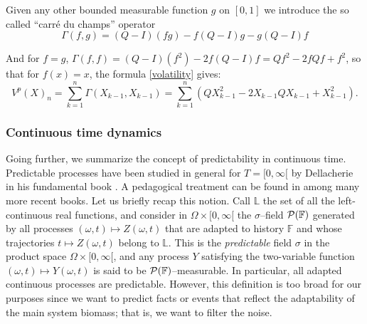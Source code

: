 \documentclass[12pt]{article}
\begin{document}
Given any other bounded measurable function $g$ on $[0,1]$ we introduce the so called ``carré du champs'' operator
\begin{equation}
    \Gamma (f,g)=(Q-I)(fg)-f(Q-I)g-g(Q-I)f
\end{equation}

And for $f=g$, $\Gamma (f,f)=(Q-I)(f^2)-2f(Q-I)f=Qf^2-2fQf+f^2$, so that for $f(x)=x$, the formula \eqref{volatility} gives:
\begin{equation}
    V^p(X)_n=\sum_{k=1}^n\Gamma (X_{k-1},X_{k-1})=\sum_{k=1}^n\left(QX_{k-1}^2-2X_{k-1}QX_{k-1}+X_{k-1}^2\right).
\end{equation}
\subsubsection{Continuous time dynamics}
Going further, we summarize the concept of predictability in continuous time. Predictable processes have been studied in general for $T=[0,\infty[$ by Dellacherie in his fundamental book \citep{Dellacherie-1972}. A pedagogical treatment can be found in \citep{Protter} among many more recent books. Let us briefly recap this notion. Call $\mathbb{L}$ the set of all the left-continuous real functions, and consider in $\Omega\times [0,\infty[$ the $\sigma$--field $\mathcal{P}(\mathbb{F})$ generated by all processes $(\omega,t)\mapsto Z(\omega,t)$ that are adapted to history $\mathbb{F}$ and whose trajectories $t\mapsto Z(\omega,t)$ belong to $\mathbb{L}$. This is the \textit{predictable} field $\sigma$ in the product space $\Omega\times [0,\infty[$, and any process $Y$ satisfying the two-variable function $(\omega,t)\mapsto Y(\omega,t)$ is said to be $\mathcal{P}(\mathbb{F})$--measurable. In particular, all adapted continuous processes are predictable. However, this definition is too broad for our purposes since we want to predict facts or events that reflect the adaptability of the main system biomass; that is, we want to filter the noise. 
\end{document}

